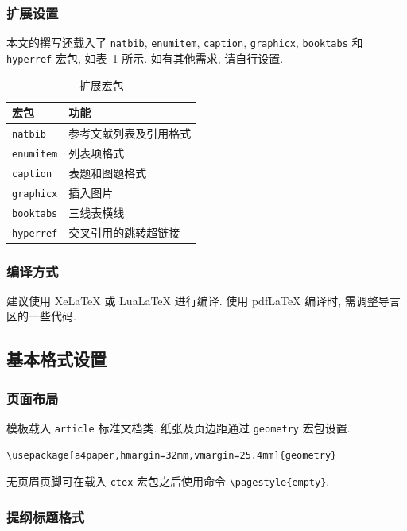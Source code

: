 \documentclass{article}
\begin{document}
\subsubsection{扩展设置}

本文的撰写还载入了 \verb'natbib', \verb'enumitem', \verb'caption', \verb'graphicx', \verb'booktabs' 和 \verb'hyperref' 宏包, 如表~\ref{tab:extra} 所示.
如有其他需求, 请自行设置.

\begin{table}[htbp!]
  \caption{扩展宏包}
  \label{tab:extra}
  \centering
  \begin{tabular}{ll} \toprule
    \sffamily 宏包  & \sffamily 功能 \\ \midrule
    \verb'natbib'   & 参考文献列表及引用格式 \\ 
    \verb'enumitem' & 列表项格式 \\
    \verb'caption'  & 表题和图题格式 \\
    \verb'graphicx' & 插入图片 \\
    \verb'booktabs' & 三线表横线 \\
    \verb'hyperref' & 交叉引用的跳转超链接 \\ \bottomrule
  \end{tabular} 
\end{table}

\subsubsection{编译方式}

建议使用 XeLaTeX 或 LuaLaTeX 进行编译.
使用 pdfLaTeX 编译时, 需调整导言区的一些代码.

\subsection{基本格式设置}

\subsubsection{页面布局}

模板载入 \verb'article' 标准文档类.
纸张及页边距通过 \verb'geometry' 宏包设置.
\begin{verbatim}
\usepackage[a4paper,hmargin=32mm,vmargin=25.4mm]{geometry}
\end{verbatim}
无页眉页脚可在载入 \verb'ctex' 宏包之后使用命令 \verb'\pagestyle{empty}'.

\subsubsection{提纲标题格式}
\end{document}
